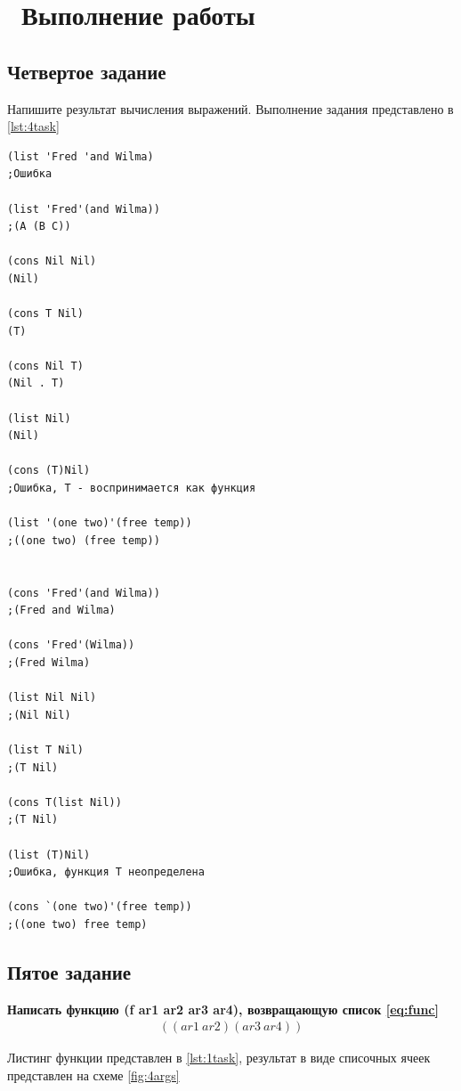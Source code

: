 \chapter{ Выполнение работы}
\label{cha:analysis}

\section{ Четвертое задание}
Напишите результат вычисления выражений. Выполнение задания представлено в \ref{lst:4task}
\begin{lstlisting}[style=lispStyle, caption={Выражения и их результат},
                label={lst:4task}]
(list 'Fred 'and Wilma)
;Ошибка

(list 'Fred'(and Wilma))
;(A (B C))

(cons Nil Nil)
(Nil)

(cons T Nil)
(T)

(cons Nil T)
(Nil . T)

(list Nil)
(Nil)

(cons (T)Nil)
;Ошибка, T - воспринимается как функция

(list '(one two)'(free temp))
;((one two) (free temp))


(cons 'Fred'(and Wilma))
;(Fred and Wilma)

(cons 'Fred'(Wilma))
;(Fred Wilma)

(list Nil Nil)
;(Nil Nil)

(list T Nil)
;(T Nil)

(cons T(list Nil))
;(T Nil)

(list (T)Nil)
;Ошибка, функция T неопределена

(cons `(one two)'(free temp))
;((one two) free temp)
\end{lstlisting}

\section{ Пятое задание}
\textbf{Написать функцию (f ar1 ar2 ar3 ar4), возвращающую список \ref{eq:func}}
\begin{align}
((ar1\ ar2)(ar3\ ar4)) \label{eq:func}
\end{align}

Листинг функции представлен в \ref{lst:1task}, результат в виде списочных ячеек представлен на схеме \ref{fig:4args}

